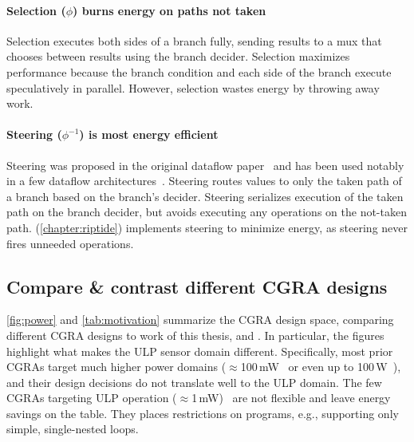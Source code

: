 \paragraph{Selection ($\phi$) burns energy on paths not taken}
Selection executes both sides of a branch fully, sending results to a mux that
chooses between results using the branch decider.
%
Selection maximizes performance because the branch condition and each side of the branch execute speculatively in parallel.
%
% 
However, selection wastes energy by throwing away work.

\paragraph{Steering ($\phi^{-1}$) is most energy efficient}
%
Steering was proposed in the original dataflow paper~\cite{dennis1975preliminary}
and has been used notably in a few dataflow architectures~\cite{swanson2003wavescalar,dataflow-a-complement,mishra2006tartan,beret,seed}.
% 
Steering routes values to only the taken path of a branch based on the branch's
decider.
%
Steering serializes execution of the taken path on the branch decider, but
avoids executing any operations on the not-taken path.
%
\riptide (\autoref{chapter:riptide}) implements steering to minimize energy,
as steering never fires unneeded operations. 

\figPower
\tabMotivate
\subsection{Compare \& contrast different CGRA designs}
\autoref{fig:power} and \autoref{tab:motivation} summarize the CGRA design space, comparing different CGRA designs to work of this thesis, \snafu and \riptide.
% 
In particular, the figures highlight what makes the ULP sensor domain different.
% 
Specifically, most prior CGRAs target much higher power domains ($\approx$100\,mW~\cite{weng2020dsagen,karunaratne2017hycube,nowatzki:isca17:stream-dataflow,tan2018stitch,weng2020hybrid} or even up to 100\,W~\cite{plasticine,voitsechov2014single}),
and their design decisions do not translate well to the ULP domain.
%
The few CGRAs targeting ULP operation ($\approx$1\,mW)~\cite{ipa,cma,srp} are not flexible and leave energy savings on the table. 
% 
They places restrictions on programs, e.g., supporting only simple, single-nested loops.

